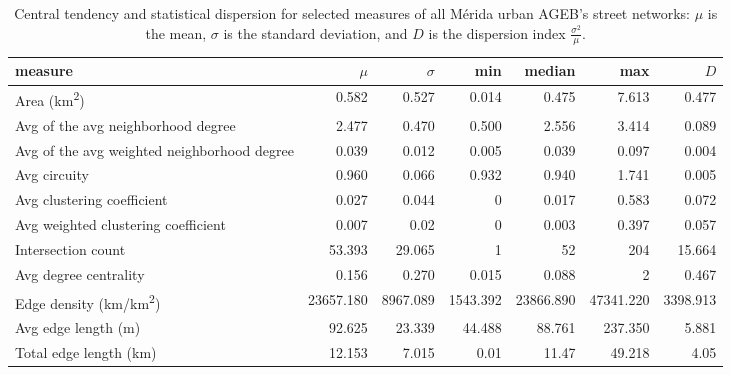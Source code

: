 \begin{table}[htbp]
	\centering
	\caption{Central tendency and statistical dispersion for selected measures of all Mérida urban AGEB's street networks: $\mu$ is the mean, $\sigma$ is the standard deviation, and $D$ is the dispersion index $\frac{\sigma ^ 2}{\mu}$.}
	\label{tab:measures_urban_agebs}
	\small
	\begin{tabular}{ l r r r r r r }
		\toprule
		measure                                          & $\mu$          & $\sigma$       & min            & median         & max            & $D$            \\
		\midrule
		Area (km\textsuperscript{2})                     & 0.582        & 0.527        & 0.014         & 0.475        & 7.613       & 0.477       \\
		Avg of the avg neighborhood degree               & 2.477          & 0.470          & 0.500          & 2.556          & 3.414          & 0.089          \\
		Avg of the avg weighted neighborhood degree      & 0.039          & 0.012          & 0.005          & 0.039          & 0.097          & 0.004          \\
		Avg circuity                                     & 0.960          & 0.066          & 0.932          & 0.940          & 1.741          & 0.005 \\
		Avg clustering coefficient                       & 0.027          & 0.044          & 0          & 0.017          & 0.583          & 0.072          \\
		Avg weighted clustering coefficient              & 0.007          & 0.02          & 0 & 0.003          & 0.397          & 0.057 \\
		Intersection count                               & 53.393          & 29.065          & 1            & 52           & 204         & 15.664      \\
		Avg degree centrality                            & 0.156          & 0.270          & 0.015 & 0.088          & 2          & 0.467          \\
		Edge density (km/km\textsuperscript{2})          & 23657.180         & 8967.089          & 1543.392          & 23866.890         & 47341.220         & 3398.913          \\
		Avg edge length (m)                              & 92.625        & 23.339         & 44.488        & 88.761        & 237.350        & 5.881          \\
		Total edge length (km)                           & 12.153           & 7.015          & 0.01            & 11.47           & 49.218         & 4.05      \\

\end{tabular}
\end{table}
